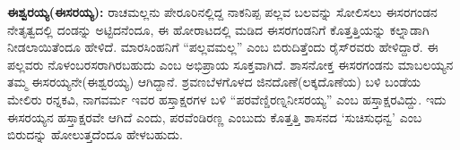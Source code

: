 \textbf{ಈಶ್ವರಯ್ಯ(ಈಸರಯ್ಯ): }ರಾಚಮಲ್ಲನು ಪೇರೂರಿನಲ್ಲಿದ್ದ ನಾಕನಿಪ್ಪ ಪಲ್ಲವ ಬಲವನ್ನು ಸೋಲಿಸಲು ಈಸರಗಂಡನ ನೇತೃತ್ವದಲ್ಲಿ ದಂಡನ್ನು ಅಟ್ಟಿದನೆಂದೂ, ಈ ಹೋರಾಟದಲ್ಲಿ ಮಡಿದ ಈಸರಗಂಡನಿಗೆ ಕೊತ್ತತ್ತಿಯನ್ನು ಕಲ್ನಾಡಾಗಿ ನೀಡಲಾಯಿ\-ತೆಂದೂ ಹೇಳಿದೆ. ಮಾರಸಿಂಹನಿಗೆ “ಪಲ್ಲವಮಲ್ಲ” ಎಂಬ ಬಿರುದಿತ್ತೆಂದು ರೈಸ್​ರವರು ಹೇಳಿದ್ದಾರೆ. ಈ ಪಲ್ಲವರು ನೊಳಂಬರಸರಾಗಿರಬಹುದು ಎಂಬ ಅಭಿಪ್ರಾಯ ಸೂಕ್ತವಾಗಿದೆ. ಶಾಸನೋಕ್ತ ಈಸರಗಂಡನು ಮಾಬಲಯ್ಯನ ತಮ್ಮ ಈಸರಯ್ಯನೇ(ಈಶ್ವರಯ್ಯ) ಆಗಿದ್ದಾನೆ. ಶ್ರವಣಬೆಳಗೊಳದ ಜಿನದೊಣೆ(ಲಕ್ಕದೊಣೆಯ) ಬಳಿ ಬಂಡೆಯ ಮೇಲಿರು ರನ್ನಕವಿ, ನಾಗವರ್ಮ ಇವರ ಹಸ್ತಾಕ್ಷರಗಳ ಬಳಿ “ಪರವೆಣ್ಡಿರಣ್ನನೀಸರಯ್ಯ” ಎಂಬ ಹಸ್ತಾಕ್ಷರವಿದ್ದು. ಇದು ಈಸರಯ್ಯನ ಹಸ್ತಾಕ್ಷರವೇ ಆಗಿದೆ ಎಂದು, ಪರವೆಂಡಿರಣ್ಣ ಎಂಬುದು ಕೊತ್ತತ್ತಿ ಶಾಸನದ ‘ಸುಚಿಸುಧನ್ವ’ ಎಂಬ ಬಿರುದನ್ನು ಹೋಲುತ್ತದೆಂದೂ ಹೇಳಬಹುದು.

